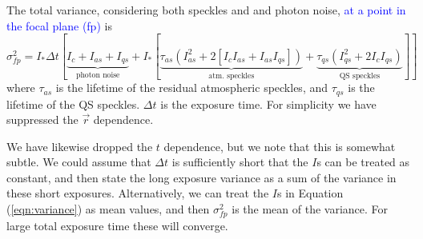 \documentclass[10pt,preprint]{aastex631}
\newcommand{\jrmadd}[1]{\textcolor{blue}{#1}}
\begin{document}
The total variance, considering both speckles and and photon noise, \jrmadd{at a point in the focal plane (fp)} is \citep{2007ApJ...669..642S} 
\begin{equation}
\sigma^2_{fp}  = I_* \Delta t [\underbrace{I_c + I_{as} + I_{qs}}_{\mbox{photon noise}} + I_* [ \underbrace{\tau_{as}\left(I_{as}^2 + 2[I_cI_{as} + I_{as}I_{qs}]  \right)}_{\mbox{atm. speckles}} +  \underbrace{\tau_{qs}\left( I_{qs}^2 + 2 I_c I_{qs}\right)}_{\mbox{QS speckles}}]]
\label{eqn:variance}
\end{equation}
where $\tau_{as}$ is the lifetime of the residual atmospheric speckles, and $\tau_{qs}$ is the lifetime of the QS speckles. $\Delta t$ is the exposure time.  For simplicity we have suppressed the $\vec{r}$ dependence.   

We have likewise dropped the $t$ dependence, but we note that this is somewhat subtle.  We could assume that $\Delta t$ is sufficiently short that the $I$s can be treated as constant, and then state the long exposure variance as a sum of the variance in these short exposures.  Alternatively, we can treat the $I$s in Equation (\ref{eqn:variance}) as mean values, and then $\sigma^2_{fp}$ is the mean of the variance.  For large total exposure time these will converge.
\end{document}
